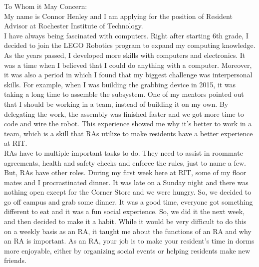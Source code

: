 \documentclass[line,margin]{res}
\begin{document}
\setlength\columnsep{-30pt}
\email{} %
\phone{} %
\address{} %
\address{} %
\website{} %
 
\begin{resume}
 \setlength
 \multicolsep{2pt}
 \begin{adjustwidth}{-92pt}{0pt}
\vspace{10pt}
To Whom it May Concern:\\

My name is Connor Henley and I am applying for the position of Resident Advisor at Rochester Institute of Technology.\\

\hspace{20pt}I have always being fascinated with computers. Right after starting 6th grade, I decided to join the LEGO Robotics program to expand my computing knowledge. As the years passed, I developed more skills with computers and electronics. It was a time when I believed that I could do anything with a computer. Moreover, it was also a period in which I found that my biggest challenge was interpersonal skills. For example, when I was building the grabbing device in 2015, it was taking a long time to assemble the subsystem. One of my mentors pointed out that I should be working in a team, instead of building it on my own. By delegating the work, the assembly was finished faster and we got more time to code and wire the robot. This experience showed me why it’s better to work in a team, which is a skill that RAs utilize to make residents have a better experience at RIT. \\

\hspace{20pt}RAs have to multiple important tasks to do. They need to assist in roommate agreements, health and safety checks and enforce the rules, just to name a few. But, RAs have other roles. During my first week here at RIT, some of my floor mates and I procrastinated dinner. It was late on a Sunday night and there was nothing open except for the Corner Store and we were hungry. So, we decided to go off campus and grab some dinner. It was a good time, everyone got something different to eat and it was a fun social experience. So, we did it the next week, and then decided to make it a habit. While it would be very difficult to do this on a weekly basis as an RA, it taught me about the functions of an RA and why an RA is important. As an RA, your job is to make your resident’s time in dorms more enjoyable, either by organizing social events or helping residents make new friends.\\


\end{adjustwidth}
\end{resume}
\end{document}
